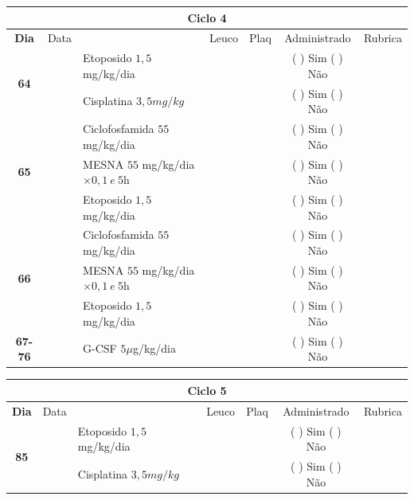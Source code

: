 \documentclass[11pt,a4paper,oldfontcommands]{memoir}
\begin{document}
\begin{center}
\begin{table}[H] \small
\begin{tabular}{p{1cm}c|p{4.7cm}|p{1.8cm}p{1.8cm}|c|c}
	\hline
	\multicolumn{7}{c}{Ciclo 4} \\
	\hline
	\multicolumn{1}{c|}{\multirow{1}{*}{\textbf{Dia}}}&{Data}&{}&\multicolumn{1}{c|}{Leuco}&\multicolumn{1}{c|}{Plaq}&{Administrado}&{Rubrica} \\
    \hline
    \multicolumn{1}{c|}{\multirow{2}{*}{\textbf{64}}}&&{Etoposido \(1,5\) mg/kg/dia}&\multicolumn{1}{c|}{}&&{(  ) Sim (  ) Não}&\\
    \cline{4-5}
    \multicolumn{1}{c|}{}&\multirow{1}{*}{}&{Cisplatina \(3,5mg/kg\)}&&&{(  ) Sim (  ) Não}&\\
    \hline
    \multicolumn{1}{c|}{\multirow{3}{*}{\textbf{65}}}&&{Ciclofosfamida \(55\) mg/kg/dia}&{}&&{(  ) Sim (  ) Não}&\\
    \multicolumn{1}{c|}{}&&{MESNA \(55\) mg/kg/dia \(\times 0,1 \:e\: 5\)h}&&&{(  ) Sim (  ) Não}&\\
    \multicolumn{1}{c|}{}&&{Etoposido \(1,5\) mg/kg/dia}&&&{(  ) Sim (  ) Não}&\\
    \hline
    \multicolumn{1}{c|}{\multirow{3}{*}{\textbf{66}}}&&{Ciclofosfamida \(55\) mg/kg/dia}&{}&&{(  ) Sim (  ) Não}&\\
    \multicolumn{1}{c|}{}&&{MESNA \(55\) mg/kg/dia \(\times 0,1 \:e\: 5\)h}&&&{(  ) Sim (  ) Não}&\\
    \multicolumn{1}{c|}{}&\multirow{1}{*}{}&{Etoposido \(1,5\) mg/kg/dia}&{}&&{(  ) Sim (  ) Não}&\\
    \hline
    \multicolumn{1}{c|}{\textbf{67-76}}&&{G-CSF \(5 \mu\)g/kg/dia }&&&{(  ) Sim (  ) Não}&\\
    \hline
\end{tabular}
\end{table}
\begin{table}[H] \small
\begin{tabular}{p{1cm}c|p{4.7cm}|p{1.8cm}p{1.8cm}|c|c}
	\hline
	\multicolumn{7}{c}{Ciclo 5} \\
	\hline
	\multicolumn{1}{c|}{\multirow{1}{*}{\textbf{Dia}}}&{Data}&{}&\multicolumn{1}{c|}{Leuco}&\multicolumn{1}{c|}{Plaq}&{Administrado}&{Rubrica} \\
    \hline
    \multicolumn{1}{c|}{\multirow{2}{*}{\textbf{85}}}&&{Etoposido \(1,5\) mg/kg/dia}&\multicolumn{1}{c|}{}&&{(  ) Sim (  ) Não}&\\
    \cline{4-5}
    \multicolumn{1}{c|}{}&\multirow{1}{*}{}&{Cisplatina \(3,5mg/kg\)}&&&{(  ) Sim (  ) Não}&\\

\end{tabular}
\end{table}
\end{center}
\end{document}
